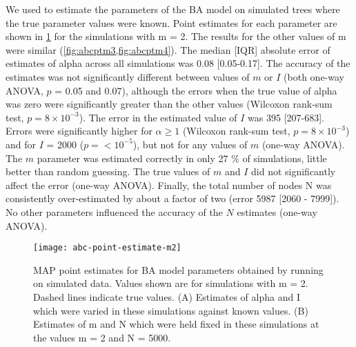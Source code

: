 We used  to estimate the parameters of the \gls{BA} model on
simulated trees where the true parameter values were known. Point estimates for
each parameter are shown in \cref{fig:abcptm2} for the simulations with \gls{m} =
2. The results for the other values of \gls{m} were similar
(\cref{fig:abcptm3,fig:abcptm4}). The median [IQR] absolute error of estimates of
\gls{alpha} across all simulations was
    0.08 
    [0.05-0.17].
The accuracy of the estimates was not significantly different between values of
$m$ or $I$ (both one-way ANOVA,
    $p$ = 0.05
and 
    0.07),
although the errors when the true value of \gls{alpha} was zero were
significantly greater than the other values 
    (Wilcoxon rank-sum test, $p = 8\!\times\!10^{-3}$).
The error in the estimated value of $I$ was
    395 
    [207-683].
Errors were significantly higher for $\alpha \geq 1$
    (Wilcoxon rank-sum test, $p = 8\!\times\!10^{-3}$)
and for $I$ = 2000
    ($p = {<}10^{-5}$),
but not for any values of $m$ (one-way ANOVA). The $m$ parameter was estimated
correctly in only
    27 \%
of simulations, little better than random guessing. The true values of $m$ and
$I$ did not significantly affect the error (one-way ANOVA). Finally, the total
number of nodes \gls{N} was consistently over-estimated by about a factor of
two
    (error 5987 
    [2060 - 
     7999]).
No other parameters influenced the accuracy of the $N$ estimates (one-way
ANOVA).

\begin{figure}
  \texttt{[image: abc-point-estimate-m2]}
  \caption[\Acrlong{MAP} point estimates for \gls{BA} model parameters obtained
    by running  on simulated data, for simulations with $m = 2$.] 
  {
    \Acrlong{MAP} point estimates for \gls{BA} model parameters obtained by         
    running  on simulated data. Values shown are for               
    simulations with \gls{m} = 2. Dashed lines indicate true values. (A)            
    Estimates of \gls{alpha} and \gls{I} which were varied in these simulations  
    against known values. (B) Estimates of \gls{m} and \gls{N} which were held   
    fixed in these simulations at the values \gls{m} = 2 and \gls{N} = 5000. 
  }
  \label{fig:abcptm2}
\end{figure}



